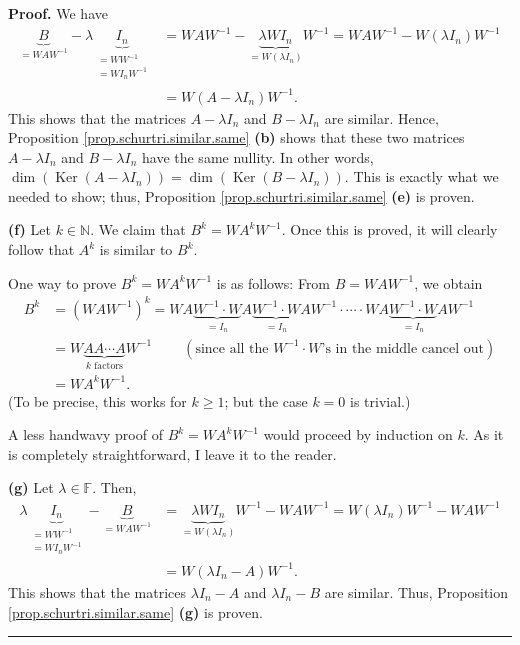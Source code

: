 \documentclass[numbers=enddot,12pt,final,onecolumn,notitlepage]{scrartcl}%
\numberwithin{exer}{subsection}
\theoremstyle{definition}
\newenvironment{proof}[1][Proof]{\noindent\textbf{#1.} }{\ \rule{0.5em}{0.5em}}
\begin{document}
\begin{proof}
We have%
\begin{align*}
\underbrace{B}_{=WAW^{-1}}-\lambda\underbrace{I_{n}}_{\substack{=WW^{-1}%
\\=WI_{n}W^{-1}}}  &  =WAW^{-1}-\underbrace{\lambda WI_{n}}_{=W\left(  \lambda
I_{n}\right)  }W^{-1}=WAW^{-1}-W\left(  \lambda I_{n}\right)  W^{-1}\\
&  =W\left(  A-\lambda I_{n}\right)  W^{-1}.
\end{align*}
This shows that the matrices $A-\lambda I_{n}$ and $B-\lambda I_{n}$ are
similar. Hence, Proposition \ref{prop.schurtri.similar.same} \textbf{(b)}
shows that these two matrices $A-\lambda I_{n}$ and $B-\lambda I_{n}$ have the
same nullity. In other words, $\dim\left(  \operatorname*{Ker}\left(
A-\lambda I_{n}\right)  \right)  =\dim\left(  \operatorname*{Ker}\left(
B-\lambda I_{n}\right)  \right)  $. This is exactly what we needed to show;
thus, Proposition \ref{prop.schurtri.similar.same} \textbf{(e)} is proven.
\medskip

\textbf{(f)} Let $k\in\mathbb{N}$. We claim that $B^{k}=WA^{k}W^{-1}$. Once
this is proved, it will clearly follow that $A^{k}$ is similar to $B^{k}$.

One way to prove $B^{k}=WA^{k}W^{-1}$ is as follows: From $B=WAW^{-1}$, we
obtain%
\begin{align*}
B^{k}  &  =\left(  WAW^{-1}\right)  ^{k}=WA\underbrace{W^{-1}\cdot W}_{=I_{n}%
}A\underbrace{W^{-1}\cdot W}_{=I_{n}}AW^{-1}\cdot\cdots\cdot
WA\underbrace{W^{-1}\cdot W}_{=I_{n}}AW^{-1}\\
&  =W\underbrace{AA\cdots A}_{k\text{ factors}}W^{-1}%
\ \ \ \ \ \ \ \ \ \ \left(  \text{since all the }W^{-1}\cdot W\text{'s in the
middle cancel out}\right) \\
&  =WA^{k}W^{-1}.
\end{align*}
(To be precise, this works for $k\geq1$; but the case $k=0$ is trivial.)

A less handwavy proof of $B^{k}=WA^{k}W^{-1}$ would proceed by induction on
$k$. As it is completely straightforward, I leave it to the reader. \medskip

\textbf{(g)} Let $\lambda\in\mathbb{F}$. Then,
\begin{align*}
\lambda\underbrace{I_{n}}_{\substack{=WW^{-1}\\=WI_{n}W^{-1}}}-\underbrace{B}%
_{=WAW^{-1}}  &  =\underbrace{\lambda WI_{n}}_{=W\left(  \lambda I_{n}\right)
}W^{-1}-WAW^{-1}=W\left(  \lambda I_{n}\right)  W^{-1}-WAW^{-1}\\
&  =W\left(  \lambda I_{n}-A\right)  W^{-1}.
\end{align*}
This shows that the matrices $\lambda I_{n}-A$ and $\lambda I_{n}-B$ are
similar. Thus, Proposition \ref{prop.schurtri.similar.same} \textbf{(g)} is proven.
\end{proof}
\end{document}
